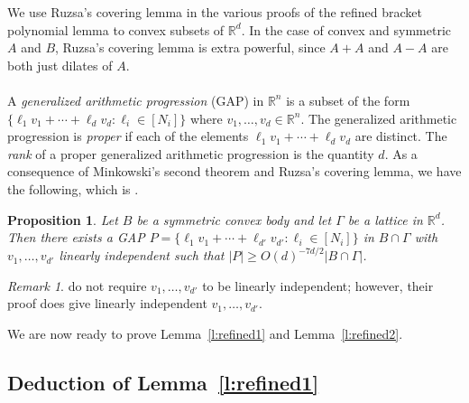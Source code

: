 \documentclass[11pt, a4paper]{amsart}
\theoremstyle{plain}
\theoremstyle{plain}
\newtheorem{proposition}{Proposition}
\theoremstyle{definition}
\theoremstyle{remark}
\newtheorem*{remark}{Remark}
\numberwithin{equation}{section}
\numberwithin{lemma}{section}
\numberwithin{proposition}{section}
\numberwithin{corollary}{section}
\numberwithin{definition}{section}
\numberwithin{claim}{section}
\begin{document}
We use Ruzsa's covering lemma in the various proofs of the refined bracket polynomial lemma to convex subsets of $\mathbb{R}^d$. In the case of convex and symmetric $A$ and $B$, Ruzsa's covering lemma is extra powerful, since $A + A$ and $A - A$ are both just dilates of $A$.\\\\
A \emph{generalized arithmetic progression} (GAP) in $\mathbb{R}^n$ is a subset of the form $\{\ell_1v_1 + \cdots + \ell_d v_d: \ell_i \in [N_i]\}$ where $v_1, \dots, v_d \in \mathbb{R}^n$. The generalized arithmetic progression is \emph{proper} if each of the elements $\ell_1 v_1+ \cdots + \ell_d v_d$ are distinct. The \emph{rank} of a proper generalized arithmetic progression is the quantity $d$. As a consequence of Minkowski's second theorem and Ruzsa's covering lemma, we have the following, which is \cite[Lemma 3.33]{TV10}.
\begin{proposition}\label{p:properprogression}
    Let $B$ be a symmetric convex body and let $\Gamma$ be a lattice in $\mathbb{R}^d$. Then there exists a GAP $P = \{\ell_1 v_1 + \cdots + \ell_{d'} v_{d'}: \ell_i \in [N_i]\}$ in $B \cap \Gamma$ with $v_1, \dots, v_{d'}$ linearly independent such that $|P| \ge O(d)^{-7d/2}|B \cap \Gamma|$.
\end{proposition}
\begin{remark}
\cite[Lemma 3.33]{TV10} do not require $v_1, \dots, v_{d'}$ to be linearly independent; however, their proof does give linearly independent $v_1, \dots, v_{d'}$.
\end{remark}
We are now ready to prove Lemma~\ref{l:refined1} and Lemma~\ref{l:refined2}.
\subsection{Deduction of Lemma~\ref{l:refined1}}
\end{document}
